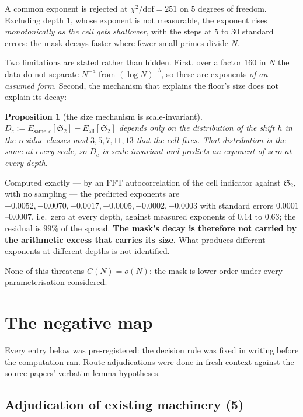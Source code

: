 \documentclass[11pt,a4paper]{article}
\theoremstyle{plain}
\newtheorem{proposition}[theorem]{Proposition}
\theoremstyle{definition}
\renewcommand{\SS}{\mathfrak{S}}
\begin{document}
A common exponent is rejected at $\chi^2/\mathrm{dof} = 251$ on
$5$ degrees of freedom. Excluding depth $1$, whose exponent is not
measurable, the exponent rises \emph{monotonically as the cell gets
shallower}, with the steps at $5$ to $30$ standard errors: the mask
decays faster where fewer small primes divide $N$.

Two limitations are stated rather than hidden. First, over a factor
$160$ in $N$ the data do not separate $N^{-a}$ from $(\log N)^{-b}$, so
these are exponents \emph{of an assumed form}. Second, the mechanism
that explains the floor's size does not explain its decay:

\begin{proposition}[the size mechanism is scale-invariant]
\label{prop:scaleinv}
$D_c := E_{\mathrm{same},c}[\SS_2] - E_{\mathrm{all}}[\SS_2]$ depends
only on the distribution of the shift $h$ in the residue classes mod
$3,5,7,11,13$ that the cell fixes. That distribution is the same at
every scale, so $D_c$ is scale-invariant and predicts an exponent of
zero at every depth.
\end{proposition}

Computed exactly --- by an FFT autocorrelation of the cell indicator
against $\SS_2$, with no sampling --- the predicted exponents are
$-0.0052, -0.0070, -0.0017, -0.0005, -0.0002, -0.0003$ with standard
errors $0.0001$--$0.0007$, i.e.\ zero at every depth, against measured
exponents of $0.14$ to $0.63$; the residual is $99\%$ of the spread.
\textbf{The mask's decay is therefore not carried by the arithmetic
excess that carries its size.} What produces different exponents at
different depths is not identified.

None of this threatens $C(N)=o(N)$: the mask is lower order under every
parameterisation considered.

\section{The negative map}\label{sec:closures}

Every entry below was pre-registered: the decision rule was fixed in
writing before the computation ran. Route adjudications were done in
fresh context against the source papers' verbatim lemma hypotheses.

\subsection{Adjudication of existing machinery (5)}
\end{document}
